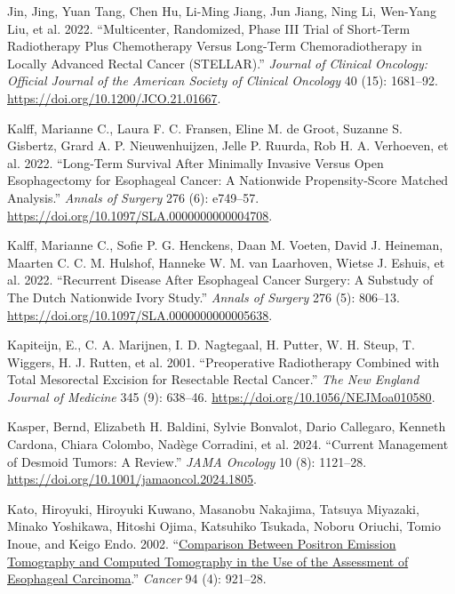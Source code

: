 \documentclass[
  letterpaper,
]{scrbook}
\newlength{\cslhangindent}
\newenvironment{CSLReferences}[2] %
 {\begin{list}{}{%
  \setlength{\itemindent}{0pt}
  \setlength{\leftmargin}{0pt}
  \setlength{\parsep}{0pt}
  \ifodd #1
   \setlength{\leftmargin}{\cslhangindent}
   \setlength{\itemindent}{-1\cslhangindent}
  \fi
  \setlength{\itemsep}{#2\baselineskip}}}
 {\end{list}}
\begin{document}
\begin{CSLReferences}{1}{0}
Jin, Jing, Yuan Tang, Chen Hu, Li-Ming Jiang, Jun Jiang, Ning Li,
Wen-Yang Liu, et al. 2022. {``Multicenter, {Randomized}, {Phase} {III}
{Trial} of {Short}-{Term} {Radiotherapy} {Plus} {Chemotherapy} {Versus}
{Long}-{Term} {Chemoradiotherapy} in {Locally} {Advanced} {Rectal}
{Cancer} ({STELLAR}).''} \emph{Journal of Clinical Oncology: Official
Journal of the American Society of Clinical Oncology} 40 (15): 1681--92.
\url{https://doi.org/10.1200/JCO.21.01667}.

Kalff, Marianne C., Laura F. C. Fransen, Eline M. de Groot, Suzanne S.
Gisbertz, Grard A. P. Nieuwenhuijzen, Jelle P. Ruurda, Rob H. A.
Verhoeven, et al. 2022. {``Long-Term {Survival} {After} {Minimally}
{Invasive} {Versus} {Open} {Esophagectomy} for {Esophageal} {Cancer}:
{A} {Nationwide} {Propensity}-Score {Matched} {Analysis}.''}
\emph{Annals of Surgery} 276 (6): e749--57.
\url{https://doi.org/10.1097/SLA.0000000000004708}.

Kalff, Marianne C., Sofie P. G. Henckens, Daan M. Voeten, David J.
Heineman, Maarten C. C. M. Hulshof, Hanneke W. M. van Laarhoven, Wietse
J. Eshuis, et al. 2022. {``Recurrent {Disease} {After} {Esophageal}
{Cancer} {Surgery}: {A} {Substudy} of {The} {Dutch} {Nationwide} {Ivory}
{Study}.''} \emph{Annals of Surgery} 276 (5): 806--13.
\url{https://doi.org/10.1097/SLA.0000000000005638}.

Kapiteijn, E., C. A. Marijnen, I. D. Nagtegaal, H. Putter, W. H. Steup,
T. Wiggers, H. J. Rutten, et al. 2001. {``Preoperative Radiotherapy
Combined with Total Mesorectal Excision for Resectable Rectal Cancer.''}
\emph{The New England Journal of Medicine} 345 (9): 638--46.
\url{https://doi.org/10.1056/NEJMoa010580}.

Kasper, Bernd, Elizabeth H. Baldini, Sylvie Bonvalot, Dario Callegaro,
Kenneth Cardona, Chiara Colombo, Nadège Corradini, et al. 2024.
{``Current {Management} of {Desmoid} {Tumors}: {A} {Review}.''}
\emph{JAMA Oncology} 10 (8): 1121--28.
\url{https://doi.org/10.1001/jamaoncol.2024.1805}.

Kato, Hiroyuki, Hiroyuki Kuwano, Masanobu Nakajima, Tatsuya Miyazaki,
Minako Yoshikawa, Hitoshi Ojima, Katsuhiko Tsukada, Noboru Oriuchi,
Tomio Inoue, and Keigo Endo. 2002.
{``\href{https://www.ncbi.nlm.nih.gov/pubmed/11920459}{Comparison
Between Positron Emission Tomography and Computed Tomography in the Use
of the Assessment of Esophageal Carcinoma}.''} \emph{Cancer} 94 (4):
921--28.


\end{CSLReferences}
\end{document}
